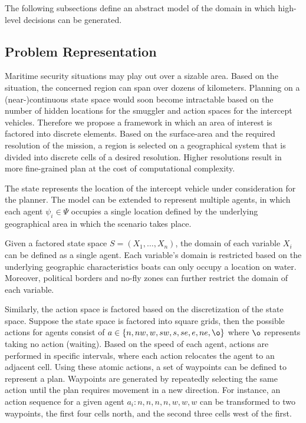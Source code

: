 \documentclass[conference]{IEEEtran}
\begin{document}
The following subsections define an abstract model of the domain in which high-level decisions can be generated.

\subsection{Problem Representation}
\label{sub:problem-rep}

Maritime security situations may play out over a sizable area. Based on the situation, the concerned region can span over dozens of kilometers. Planning on a (near-)continuous state space would soon become intractable based on the number of hidden locations for the smuggler and action spaces for the intercept vehicles. Therefore we propose a framework in which an area of interest is factored into discrete elements. Based on the surface-area and the required resolution of the mission, a region is selected on a geographical system that is divided into discrete cells of a desired resolution. Higher resolutions result in more fine-grained plan at the cost of computational complexity.

The state represents the location of the intercept vehicle under consideration for the planner. The model can be extended to represent multiple agents, in which each agent $\psi_i\in\Psi$ occupies a single location defined by the underlying geographical area in which the scenario takes place.

Given a factored state space $S = \left(X_1, \ldots, X_n\right)$, the domain of each variable $X_i$ can be defined as a single agent. Each variable's domain is restricted based on the underlying geographic characteristics \ie boats can only occupy a location on water. Moreover, political borders and no-fly zones can further restrict the domain of each variable.

Similarly, the action space is factored based on the discretization of the state space. Suppose the state space is factored into square grids, then the possible actions for agents consist of $a\in\left\{n, nw, w, sw, s, se, e, ne, \o\right\}$ where $\o$ represents taking no action (\ie waiting). Based on the speed of each agent, actions are performed in specific intervals, where each action relocates the agent to an adjacent cell. Using these atomic actions, a set of waypoints can be defined to represent a plan. Waypoints are generated by repeatedly selecting the same action until the plan requires movement in a new direction. For instance, an action sequence for a given agent $a_i: n, n, n, n, w, w, w$ can be transformed to two waypoints, the first four cells north, and the second three cells west of the first.
\end{document}
